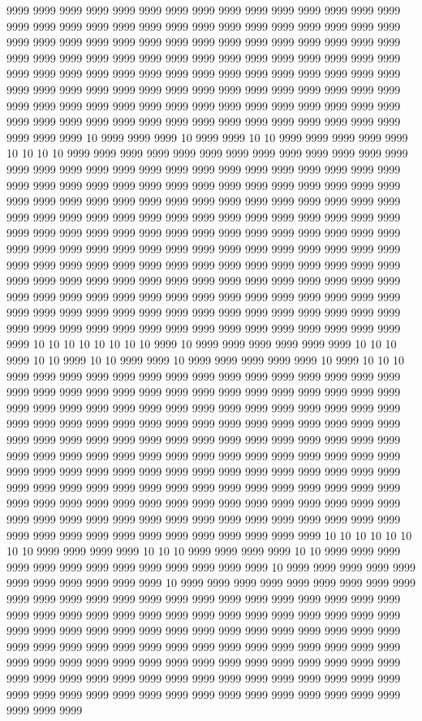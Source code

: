 9999 9999 9999 9999 9999 9999 9999 9999 9999 9999 9999 9999 9999 9999 9999 9999 9999 9999 9999 9999 9999 9999 9999 9999 9999 9999 9999 9999 9999 9999 9999 9999 9999 9999 9999 9999 9999 9999 9999 9999 9999 9999 9999 9999 9999 9999 9999 9999 9999 9999 9999 9999 9999 9999 9999 9999 9999 9999 9999 9999 9999 9999 9999 9999 9999 9999 9999 9999 9999 9999 9999 9999 9999 9999 9999 9999 9999 9999 9999 9999 9999 9999 9999 9999 9999 9999 9999 9999 9999 9999 9999 9999 9999 9999 9999 9999 9999 9999 9999 9999 9999 9999 9999 9999 9999 9999 9999 9999 9999 9999 9999 9999 9999 9999 9999 9999 9999 9999 9999 9999 9999 9999 9999 10 9999 9999 9999 10 9999 9999 10 10 9999 9999 9999 9999 9999 10 10 10 10 9999 9999 9999 9999 9999 9999 9999 9999 9999 9999 9999 9999 9999 9999 9999 9999 9999 9999 9999 9999 9999 9999 9999 9999 9999 9999 9999 9999 9999 9999 9999 9999 9999 9999 9999 9999 9999 9999 9999 9999 9999 9999 9999 9999 9999 9999 9999 9999 9999 9999 9999 9999 9999 9999 9999 9999 9999 9999 9999 9999 9999 9999 9999 9999 9999 9999 9999 9999 9999 9999 9999 9999 9999 9999 9999 9999 9999 9999 9999 9999 9999 9999 9999 9999 9999 9999 9999 9999 9999 9999 9999 9999 9999 9999 9999 9999 9999 9999 9999 9999 9999 9999 9999 9999 9999 9999 9999 9999 9999 9999 9999 9999 9999 9999 9999 9999 9999 9999 9999 9999 9999 9999 9999 9999 9999 9999 9999 9999 9999 9999 9999 9999 9999 9999 9999 9999 9999 9999 9999 9999 9999 9999 9999 9999 9999 9999 9999 9999 9999 9999 9999 9999 9999 9999 9999 9999 9999 9999 9999 9999 9999 9999 9999 9999 9999 9999 9999 9999 9999 9999 9999 9999 9999 9999 9999 9999 9999 9999 9999 10 10 10 10 10 10 10 10 9999 10 9999 9999 9999 9999 9999 9999 10 10 10 9999 10 10 9999 10 10 9999 9999 10 9999 9999 9999 9999 9999 10 9999 10 10 10 9999 9999 9999 9999 9999 9999 9999 9999 9999 9999 9999 9999 9999 9999 9999 9999 9999 9999 9999 9999 9999 9999 9999 9999 9999 9999 9999 9999 9999 9999 9999 9999 9999 9999 9999 9999 9999 9999 9999 9999 9999 9999 9999 9999 9999 9999 9999 9999 9999 9999 9999 9999 9999 9999 9999 9999 9999 9999 9999 9999 9999 9999 9999 9999 9999 9999 9999 9999 9999 9999 9999 9999 9999 9999 9999 9999 9999 9999 9999 9999 9999 9999 9999 9999 9999 9999 9999 9999 9999 9999 9999 9999 9999 9999 9999 9999 9999 9999 9999 9999 9999 9999 9999 9999 9999 9999 9999 9999 9999 9999 9999 9999 9999 9999 9999 9999 9999 9999 9999 9999 9999 9999 9999 9999 9999 9999 9999 9999 9999 9999 9999 9999 9999 9999 9999 9999 9999 9999 9999 9999 9999 9999 9999 9999 9999 9999 9999 9999 9999 9999 9999 9999 9999 9999 9999 9999 9999 9999 9999 9999 9999 9999 10 10 10 10 10 10 10 10 9999 9999 9999 9999 10 10 10 9999 9999 9999 9999 10 10 9999 9999 9999 9999 9999 9999 9999 9999 9999 9999 9999 9999 9999 10 9999 9999 9999 9999 9999 9999 9999 9999 9999 9999 9999 10 9999 9999 9999 9999 9999 9999 9999 9999 9999 9999 9999 9999 9999 9999 9999 9999 9999 9999 9999 9999 9999 9999 9999 9999 9999 9999 9999 9999 9999 9999 9999 9999 9999 9999 9999 9999 9999 9999 9999 9999 9999 9999 9999 9999 9999 9999 9999 9999 9999 9999 9999 9999 9999 9999 9999 9999 9999 9999 9999 9999 9999 9999 9999 9999 9999 9999 9999 9999 9999 9999 9999 9999 9999 9999 9999 9999 9999 9999 9999 9999 9999 9999 9999 9999 9999 9999 9999 9999 9999 9999 9999 9999 9999 9999 9999 9999 9999 9999 9999 9999 9999 9999 9999 9999 9999 9999 9999 9999 9999 9999 9999 9999 9999 9999 9999 9999 9999 